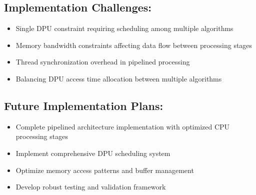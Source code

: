 \subsection{Implementation Challenges:}
\begin{itemize}
\item Single DPU constraint requiring scheduling among multiple algorithms
\item Memory bandwidth constraints affecting data flow between processing stages
\item Thread synchronization overhead in pipelined processing
\item Balancing DPU access time allocation between multiple algorithms
\end{itemize}

\subsection{Future Implementation Plans:}
\begin{itemize}
\item Complete pipelined architecture implementation with optimized CPU processing stages
\item Implement comprehensive DPU scheduling system
\item Optimize memory access patterns and buffer management
\item Develop robust testing and validation framework
\end{itemize}
